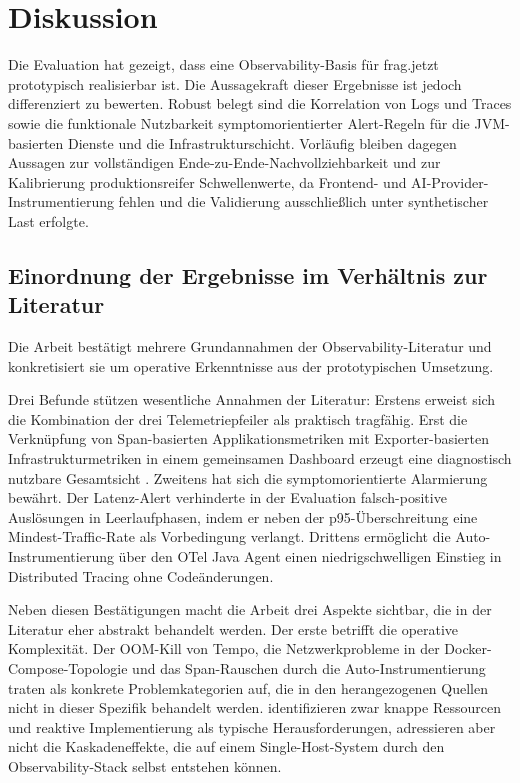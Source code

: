  
\chapter{Diskussion}
 
Die Evaluation hat gezeigt, dass eine Observability-Basis für frag.jetzt prototypisch realisierbar ist. Die Aussagekraft dieser Ergebnisse ist jedoch differenziert zu bewerten. Robust belegt sind die Korrelation von Logs und Traces sowie die funktionale Nutzbarkeit symptomorientierter Alert-Regeln für die JVM-basierten Dienste und die Infrastrukturschicht. Vorläufig bleiben dagegen Aussagen zur vollständigen Ende-zu-Ende-Nachvollziehbarkeit und zur Kalibrierung produktionsreifer Schwellenwerte, da Frontend- und AI-Provider-Instrumentierung fehlen und die Validierung ausschließlich unter synthetischer Last erfolgte.
 
 
\section{Einordnung der Ergebnisse im Verhältnis zur Literatur}
 
Die Arbeit bestätigt mehrere Grundannahmen der Observability-Literatur und konkretisiert sie um operative Erkenntnisse aus der prototypischen Umsetzung.
 
Drei Befunde stützen wesentliche Annahmen der Literatur: Erstens erweist sich die Kombination der drei Telemetriepfeiler als praktisch tragfähig. Erst die Verknüpfung von Span-basierten Applikationsmetriken mit Exporter-basierten Infrastrukturmetriken in einem gemeinsamen Dashboard erzeugt eine diagnostisch nutzbare Gesamtsicht \parencite[S.~22]{albuquerque2025tracing}. Zweitens hat sich die symptomorientierte Alarmierung bewährt. Der Latenz-Alert verhinderte in der Evaluation falsch-positive Auslösungen in Leerlaufphasen, indem er neben der p95-Über\-schreitung eine Mindest-Traffic-Rate als Vorbedingung verlangt. Drittens ermöglicht die Auto-Instrumentierung über den OTel Java Agent einen niedrigschwelligen Einstieg in Distributed Tracing ohne Codeänderungen.
 
Neben diesen Bestätigungen macht die Arbeit drei Aspekte sichtbar, die in der Literatur eher abstrakt behandelt werden. Der erste betrifft die operative Komplexität. Der OOM-Kill von Tempo, die Netzwerkprobleme in der Docker-Compose-Topologie und das Span-Rauschen durch die Auto-Instrumentierung traten als konkrete Problemkategorien auf, die in den herangezogenen Quellen nicht in dieser Spezifik behandelt werden. \textcite[S.~9]{Niedermaier2019onObservability} identifizieren zwar knappe Ressourcen und reaktive Implementierung als typische Herausforderungen, adressieren aber nicht die Kaskadeneffekte, die auf einem Single-Host-System durch den Observability-Stack selbst entstehen können.
 

